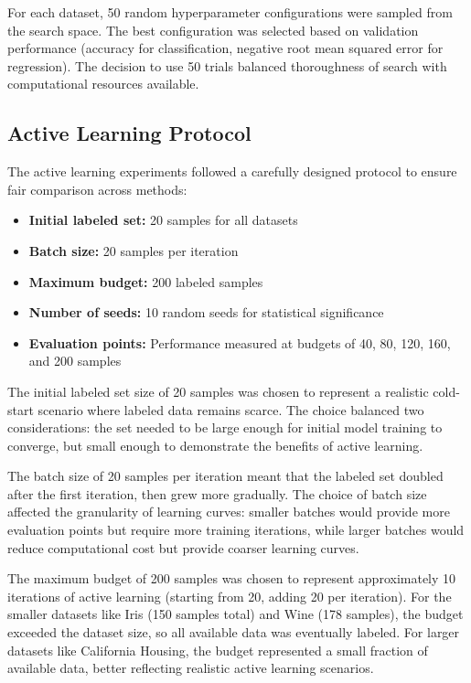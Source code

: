 \documentclass[conference]{IEEEtran}
\begin{document}
For each dataset, 50 random hyperparameter configurations were sampled from the search space. The best configuration was selected based on validation performance (accuracy for classification, negative root mean squared error for regression). The decision to use 50 trials balanced thoroughness of search with computational resources available.

\subsection{Active Learning Protocol}

The active learning experiments followed a carefully designed protocol to ensure fair comparison across methods:

\begin{itemize}
\item \textbf{Initial labeled set:} 20 samples for all datasets
\item \textbf{Batch size:} 20 samples per iteration
\item \textbf{Maximum budget:} 200 labeled samples
\item \textbf{Number of seeds:} 10 random seeds for statistical significance
\item \textbf{Evaluation points:} Performance measured at budgets of 40, 80, 120, 160, and 200 samples
\end{itemize}

The initial labeled set size of 20 samples was chosen to represent a realistic cold-start scenario where labeled data remains scarce. The choice balanced two considerations: the set needed to be large enough for initial model training to converge, but small enough to demonstrate the benefits of active learning.

The batch size of 20 samples per iteration meant that the labeled set doubled after the first iteration, then grew more gradually. The choice of batch size affected the granularity of learning curves: smaller batches would provide more evaluation points but require more training iterations, while larger batches would reduce computational cost but provide coarser learning curves.

The maximum budget of 200 samples was chosen to represent approximately 10 iterations of active learning (starting from 20, adding 20 per iteration). For the smaller datasets like Iris (150 samples total) and Wine (178 samples), the budget exceeded the dataset size, so all available data was eventually labeled. For larger datasets like California Housing, the budget represented a small fraction of available data, better reflecting realistic active learning scenarios.
\end{document}
